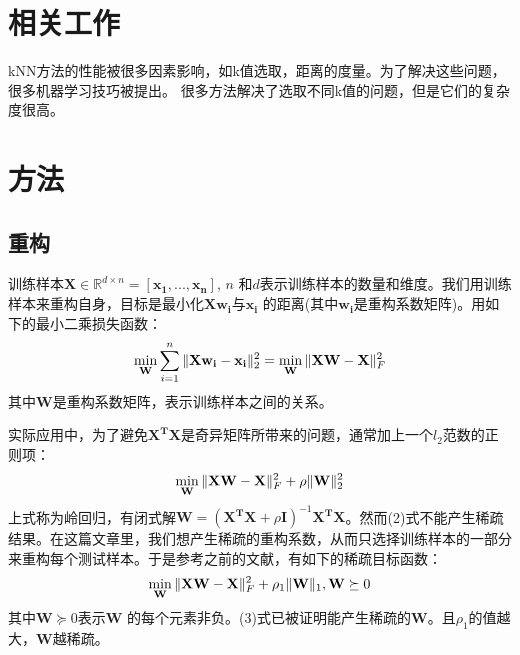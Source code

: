 \documentclass{ctexart}
\begin{document}
	\section{相关工作}
	kNN方法的性能被很多因素影响，如k值选取，距离的度量。为了解决这些问题，很多机器学习技巧被提出。
	很多方法解决了选取不同k值的问题，但是它们的复杂度很高。
	
	\section{方法} %
	\subsection{重构}
	训练样本$ \mathbf{X} \in \mathbb{R}^{d \times n} = [\mathbf{x_1}, ..., \mathbf{x_n}]$, $ n $ 和$ d $表示训练样本的数量和维度。我们用训练样本来重构自身，目标是最小化$ \mathbf{Xw_i} \text{与} \mathbf{x_i} $ 的距离(其中$ \mathbf{w_i} $是重构系数矩阵)。用如下的最小二乘损失函数：
	\begin{equation}
		\min_\mathbf{W} \sum_{i=1}^{n} \Arrowvert{\mathbf{Xw_i} - \mathbf{x_i}} \Arrowvert_{2}^{2} = \min_\mathbf{W} \Arrowvert{\mathbf{XW-X}}\Arrowvert_F^2
	\end{equation}
	其中$ \mathbf{W} $是重构系数矩阵，表示训练样本之间的关系。
	
	实际应用中，为了避免$ \mathbf{X^TX} $是奇异矩阵所带来的问题，通常加上一个$ l_2 $范数的正则项：
	\begin{equation}
		\min_\mathbf{W} \Arrowvert{\mathbf{XW-X}}\Arrowvert_{F}^{2} + \rho \Arrowvert{\mathbf W}\Arrowvert_2^2	
	\end{equation}
	上式称为岭回归，有闭式解$ \mathbf W = (\mathbf{X^TX} + \rho\mathbf I)^{-1}  \mathbf{X^TX}$。然而(2)式不能产生稀疏结果。在这篇文章里，我们想产生稀疏的重构系数，从而只选择训练样本的一部分来重构每个测试样本。于是参考之前的文献，有如下的稀疏目标函数：
	\begin{equation}
	\min_\mathbf{W} \Arrowvert{\mathbf{XW-X}}\Arrowvert_{F}^{2} + \rho_1 \Arrowvert{\mathbf W}\Arrowvert_1,\mathbf W \succeq 0
	\end{equation}
	其中$ \mathbf W \succeq 0  $表示$ \mathbf W $ 的每个元素非负。(3)式已被证明能产生稀疏的$ \mathbf W $。$ 且\rho_1 $的值越大，$ \mathbf W $越稀疏。
	
\end{document}
